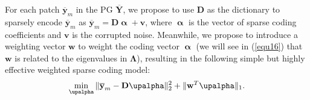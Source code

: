 For each patch $\mathbf{\overline{y}}_{m}$ in the PG $\mathbf{\overline{Y}}$, we propose to use $\mathbf{D}$ as the dictionary to sparsely encode $\mathbf{\overline{y}}_{m}$ as $\mathbf{\overline{y}}_{m}=\mathbf{D}\boldsymbol{\upalpha}+\mathbf{v}$, where $\boldsymbol{\upalpha}$ is the vector of sparse coding coefficients and $\mathbf{v}$ is the corrupted noise. Meanwhile, we propose to introduce a weighting vector $\mathbf{w}$ to weight the coding vector $\boldsymbol{\upalpha}$ (we will see in (\ref{equ16}) that $\mathbf{w}$ is related to the eigenvalues in $\mathbf{\Lambda}$), resulting in the following simple but highly effective weighted sparse coding model:
\begin{equation}\label{equ11}
\setlength{\abovedisplayskip}{3pt}
\setlength{\belowdisplayskip}{3pt}
\min_{\boldsymbol{\upalpha}}{\|\mathbf{\overline{y}}_{m}-\mathbf{D}\boldsymbol{\upalpha}\|_{2}^{2}+\|\mathbf{w}^{T}\boldsymbol{\upalpha}\|_{1}}.
\end{equation}

